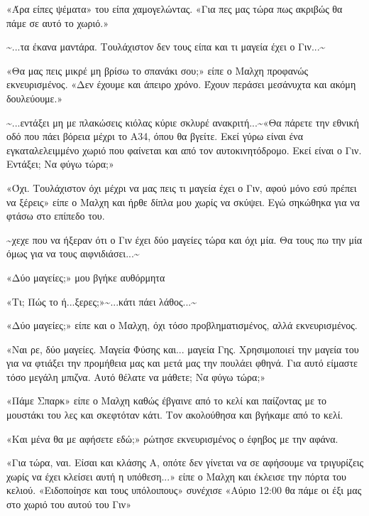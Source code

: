 \documentclass[12pt,twoside, openany]{book}
\begin{document}
«Άρα είπες ψέματα» του είπα χαμογελώντας. «Για πες μας τώρα πως ακριβώς θα πάμε σε αυτό το χωριό.»

\textasciitilde ...τα έκανα μαντάρα. Τουλάχιστον δεν τους είπα και τι μαγεία έχει ο Γιν...\textasciitilde 

«Θα μας πεις μικρέ μη βρίσω το σπανάκι σου;» είπε ο Μαλχη προφανώς εκνευρισμένος. «Δεν έχουμε και άπειρο χρόνο. Έχουν περάσει μεσάνυχτα και ακόμη δουλεύουμε.»

\textasciitilde ...εντάξει μη με πλακώσεις κιόλας κύριε σκλυρέ ανακριτή...\textasciitilde «Θα πάρετε την εθνική οδό που πάει βόρεια μέχρι το Α34, όπου θα βγείτε. Εκεί γύρω είναι ένα εγκαταλελειμμένο χωριό που φαίνεται και από τον αυτοκινητόδρομο. Εκεί είναι ο Γιν. Εντάξει; Να φύγω τώρα;»

«Όχι. Τουλάχιστον όχι μέχρι να μας πεις τι μαγεία έχει ο Γιν, αφού μόνο εσύ πρέπει να ξέρεις» είπε ο Μαλχη και ήρθε δίπλα μου χωρίς να σκύψει. Εγώ σηκώθηκα για να φτάσω στο επίπεδο του.

\textasciitilde χεχε που να ήξεραν ότι ο Γιν έχει δύο μαγείες τώρα και όχι μία. Θα τους πω την μία όμως για να τους αιφνιδιάσει...\textasciitilde 

«Δύο μαγείες;» μου βγήκε αυθόρμητα

«Τι; Πώς το ή...ξερες;»\textasciitilde ...κάτι πάει λάθος...\textasciitilde 

«Δύο μαγείες;» είπε και ο Μαλχη, όχι τόσο προβληματισμένος, αλλά εκνευρισμένος.

«Ναι ρε, δύο μαγείες. Μαγεία Φύσης και... μαγεία Γης. Χρησιμοποιεί την μαγεία του για να φτιάξει την προμήθεια μας και μετά μας την πουλάει φθηνά. Για αυτό είμαστε τόσο μεγάλη μπιζνα. Αυτό θέλατε να μάθετε; Να φύγω τώρα;»

«Πάμε Σπαρκ» είπε ο Μαλχη καθώς έβγαινε από το κελί και παίζοντας με το μουστάκι του λες και σκεφτόταν κάτι. Τον ακολούθησα και βγήκαμε από το κελί.

«Και μένα θα με αφήσετε εδώ;» ρώτησε εκνευρισμένος ο έφηβος με την αφάνα.

«Για τώρα, ναι. Είσαι και κλάσης Α, οπότε δεν γίνεται να σε αφήσουμε να τριγυρίζεις χωρίς να έχει κλείσει αυτή η υπόθεση...» είπε ο Μαλχη και έκλεισε την πόρτα του κελιού. «Ειδοποίησε και τους υπόλοιπους» συνέχισε «Αύριο 12:00 θα πάμε οι έξι μας στο χωριό του αυτού του Γιν»

\chapter{}
\end{document}
